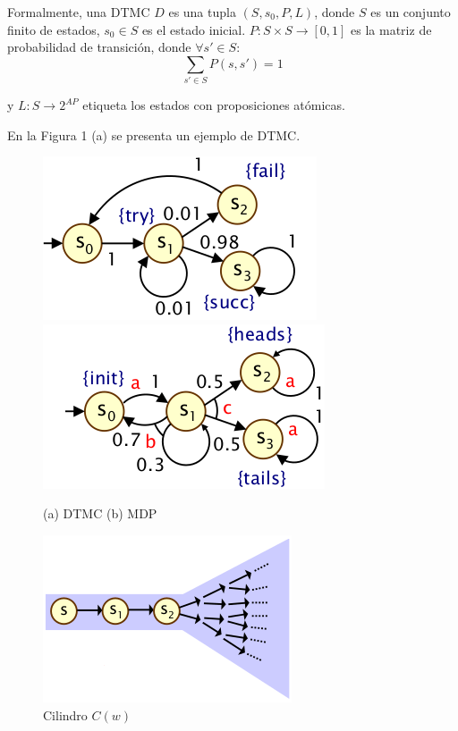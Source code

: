 \documentclass[11pt]{article}
\begin{document}
Formalmente, una DTMC $D$ es una tupla $(S, s_0, P, L)$, donde $S$ es un conjunto finito de estados, $s_0 \in S$ es el estado inicial. $P: S \times S \rightarrow [0,1]$ es la matriz de probabilidad de transici\'on, donde $\forall  s' \in S$:
\[
\sum_{s' \in S} P(s,s') = 1
\]

y $L: S \rightarrow 2^{AP}$ etiqueta los estados con proposiciones at\'omicas.

En la Figura 1 (a) se presenta un ejemplo de DTMC.

\begin{figure}[h]
	\includegraphics[scale=0.6]{DTMC.png} \includegraphics[scale=0.6]{MDP.png}
	\centering
	\caption{(a) DTMC \hspace{2cm} (b) MDP}
\end{figure}

\begin{figure}[h]
	\includegraphics[scale=0.6]{cone.png}
	\centering
	\caption{Cilindro $C(w)$}
\end{figure}
\end{document}

